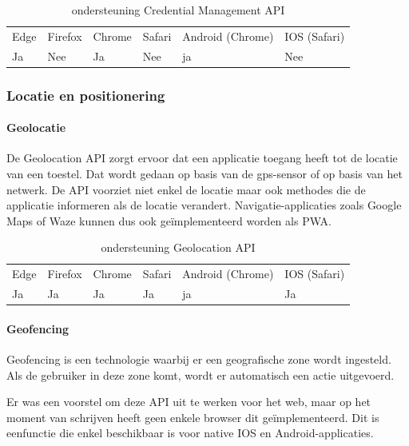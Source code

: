 \begin{table}[H]
	\begin{tabular}{llllll}
		Edge & Firefox & Chrome & Safari & Android (Chrome) & IOS (Safari) \\
		Ja   & Nee      &  Ja     & Nee     & ja               & Nee          
	\end{tabular}	
	\caption{ondersteuning Credential Management API}
	\label{ondersteuning Credential Management API}
\end{table}

\subsubsection{Locatie en positionering}

\paragraph{Geolocatie}
De Geolocation API \autocite{Popescu2020} zorgt ervoor dat een applicatie toegang heeft tot de locatie van een toestel. Dat wordt gedaan op basis van de gps-sensor of op basis van het netwerk. 
De API voorziet niet enkel de locatie maar ook methodes die de applicatie informeren als de locatie verandert.
Navigatie-applicaties zoals Google Maps of Waze kunnen dus ook geïmplementeerd worden als PWA.

\begin{table}[H]
	\centering
	\begin{tabular}{llllll}
		Edge & Firefox & Chrome & Safari & Android (Chrome) & IOS (Safari) \\
		Ja   & Ja      &  Ja     & Ja     & ja               & Ja          
	\end{tabular}	
	\caption{ondersteuning Geolocation API}
	\label{ondersteuning Geolocation API}
\end{table}


\paragraph{Geofencing}
Geofencing is een technologie waarbij er een geografische zone wordt ingesteld. Als de gebruiker in deze zone komt, wordt er automatisch een actie uitgevoerd. 

Er was een voorstel om deze API \autocite{Kruisselbrink2020a} uit te werken voor het web, maar op het moment van schrijven heeft geen enkele browser dit geïmplementeerd. Dit is eenfunctie die enkel beschikbaar is voor native IOS en Android-applicaties.

